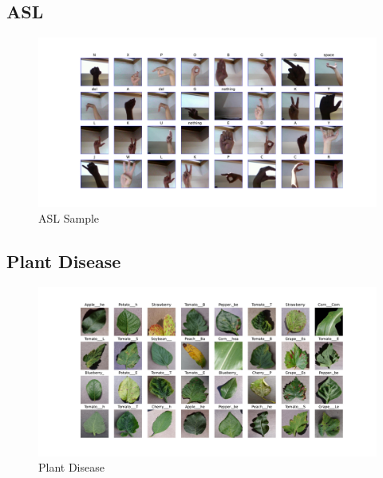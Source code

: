 \subsection*{ASL}

\begin{figure}[h]
	\centering
	\includegraphics[width=1\textwidth]{images/asl.pdf}
	\caption{ASL Sample}
	\label{fig:asl}

\end{figure}


\subsection*{Plant Disease}

\begin{figure}[h]
	\centering
	\includegraphics[width=1\textwidth]{images/plantdisease.pdf}
	\caption{Plant Disease}
	\label{fig:plant}

\end{figure}
